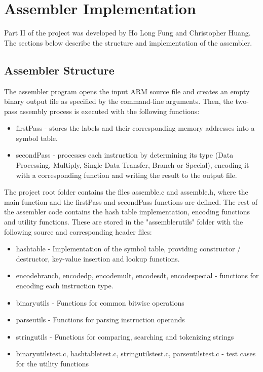 \documentclass[11pt,twoside]{article}
\begin{document}
\section{Assembler Implementation}
Part II of the project was developed by Ho Long Fung and Christopher Huang. The sections below describe the structure and implementation of the assembler.
\subsection{Assembler Structure}
The assembler program opens the input ARM source file and creates an empty binary output file as specified by the command-line arguments. Then, the two-pass assembly process is executed with the following functions:
\begin{itemize}
\item firstPass - stores the labels and their corresponding memory addresses into a symbol table.
\item secondPass - processes each instruction by determining its type (Data Processing, Multiply, Single Data Transfer, Branch or Special), encoding it with a corresponding function and writing the result to the output file.
\end{itemize}
The project root folder contains the files assemble.c and assemble.h, where the main function and the firstPass and secondPass functions are defined. The rest of the assembler code contains the hash table implementation, encoding functions and utility functions. These are stored in the "assembler\textunderscore utils" folder with the following source and corresponding header files:
\begin{itemize}
\item hash\textunderscore table - Implementation of the symbol table, providing constructor / destructor, key-value insertion and lookup functions.
\item encode\textunderscore branch, encode\textunderscore dp, encode\textunderscore mult, encode\textunderscore sdt, encode\textunderscore special - functions for encoding each instruction type.
\item binary\textunderscore utils - Functions for common bitwise operations
\item parse\textunderscore utils - Functions for parsing instruction operands
\item string\textunderscore utils - Functions for comparing, searching and tokenizing strings
\item binary\textunderscore utils\textunderscore test.c, hash\textunderscore table\textunderscore test.c, string\textunderscore utils\textunderscore test.c, parse\textunderscore utils\textunderscore test.c - test cases for the utility functions
\end{itemize}
\end{document}
